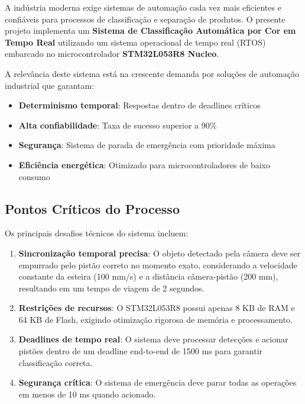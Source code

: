 \documentclass[12pt,a4paper]{article}
\begin{document}
A indústria moderna exige sistemas de automação cada vez mais eficientes e confiáveis para processos de classificação e separação de produtos. O presente projeto implementa um \textbf{Sistema de Classificação Automática por Cor em Tempo Real} utilizando um sistema operacional de tempo real (RTOS) embarcado no microcontrolador \textbf{STM32L053R8 Nucleo}.

A relevância deste sistema está na crescente demanda por soluções de automação industrial que garantam:

\begin{itemize}
    \item \textbf{Determinismo temporal}: Respostas dentro de deadlines críticos
    \item \textbf{Alta confiabilidade}: Taxa de sucesso superior a 90\%
    \item \textbf{Segurança}: Sistema de parada de emergência com prioridade máxima
    \item \textbf{Eficiência energética}: Otimizado para microcontroladores de baixo consumo
\end{itemize}

\subsection{Pontos Críticos do Processo}

Os principais desafios técnicos do sistema incluem:

\begin{enumerate}
    \item \textbf{Sincronização temporal precisa}: O objeto detectado pela câmera deve ser empurrado pelo pistão correto no momento exato, considerando a velocidade constante da esteira (100 mm/s) e a distância câmera-pistão (200 mm), resultando em um tempo de viagem de 2 segundos.

    \item \textbf{Restrições de recursos}: O STM32L053R8 possui apenas 8 KB de RAM e 64 KB de Flash, exigindo otimização rigorosa de memória e processamento.

    \item \textbf{Deadlines de tempo real}: O sistema deve processar detecções e acionar pistões dentro de um deadline end-to-end de 1500 ms para garantir classificação correta.

    \item \textbf{Segurança crítica}: O sistema de emergência deve parar todas as operações em menos de 10 ms quando acionado.
\end{enumerate}
\end{document}
